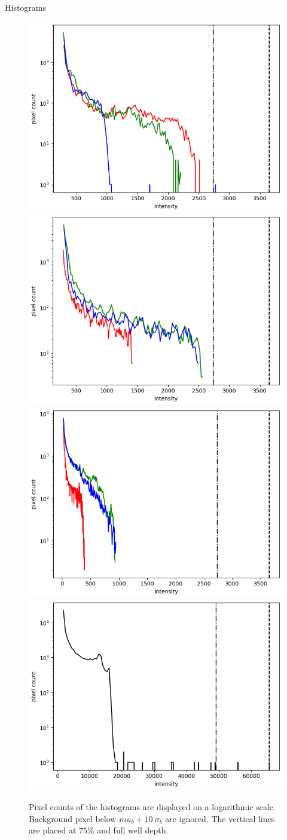 \documentclass[final,t]{beamer}
\begin{document}
\begin{frame}
\begin{columns}[t]
			
			\begin{column}{.32\linewidth}

				\begin{block}{Histograms}
					
					\begin{figure}
						\includegraphics[width=0.44\columnwidth]{img/alpori_hist.png}						\includegraphics[width=0.44\columnwidth]{img/betori_hist.png} \\
						\includegraphics[width=0.44\columnwidth]{img/alpcma_hist.png}
						\includegraphics[width=0.44\columnwidth]{img/alpleo_hist.png}
						
						\caption[histograms]%
						{Pixel counts of the histograms are displayed on a logarithmic scale. Background pixel below $mu_b + 10\ \sigma_b$ are ignored. The vertical lines are placed at $75\%$ and full well depth.}
						\label{fig:histograms}
						

\end{figure}
\end{block}
\end{column}
\end{columns}
\end{frame}
\end{document}
